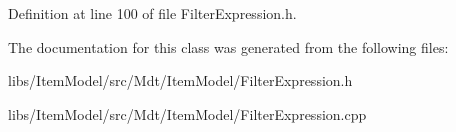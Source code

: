 Definition at line 100 of file Filter\+Expression.\+h.



The documentation for this class was generated from the following files\+:\begin{DoxyCompactItemize}
\item 
libs/\+Item\+Model/src/\+Mdt/\+Item\+Model/Filter\+Expression.\+h\item 
libs/\+Item\+Model/src/\+Mdt/\+Item\+Model/Filter\+Expression.\+cpp\end{DoxyCompactItemize}
